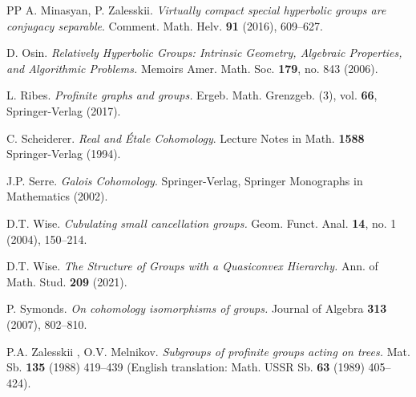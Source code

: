 \documentclass[12pt,twoside]{amsart}
\theoremstyle{definition}
\begin{document}
\begin{thebibliography}{PP}
 A. Minasyan, P. Zalesskii. \textsl{Virtually compact special hyperbolic groups are
conjugacy separable}. Comment. Math. Helv. {\bf 91} (2016), 609--627.



D. Osin. \textsl{Relatively Hyperbolic Groups: Intrinsic Geometry, Algebraic Properties, and Algorithmic Problems.}
Memoirs Amer. Math. Soc. {\bf 179}, no. 843 (2006).




 L. Ribes. \textsl{Profinite graphs and groups.} Ergeb. Math. Grenzgeb. (3), vol. {\bf 66}, Springer-Verlag (2017).


 C. Scheiderer. \textsl{Real and \'Etale  Cohomology}. Lecture Notes in Math. {\bf 1588} Springer-Verlag (1994).

J.P. Serre. \textsl{Galois Cohomology}. Springer-Verlag, Springer Monographs in Mathematics (2002).


 D.T. Wise. \textsl{Cubulating small cancellation groups.} Geom. Funct. Anal. \textbf{14}, no. 1 (2004), 150--214.

 D.T. Wise. \textsl{The Structure of Groups with a Quasiconvex Hierarchy.} Ann. of Math. Stud. {\bf 209} (2021).

P. Symonds. \textsl{On cohomology isomorphisms of groups.}
Journal of Algebra {\bf 313} (2007), 802--810.

P.A. Zalesskii , O.V. Melnikov. \textsl{Subgroups of profinite groups acting on trees.} Mat. Sb. {\bf 135} (1988)
419--439 (English translation: Math. USSR Sb.  {\bf 63} (1989) 405--424).

\end{thebibliography}
\end{document}
